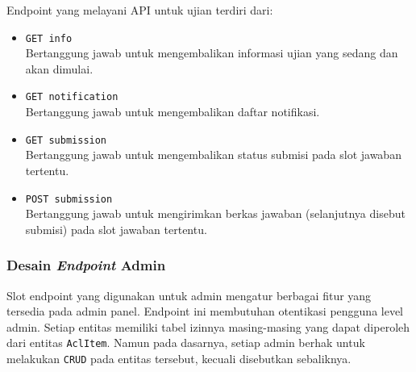     Endpoint yang melayani API untuk ujian terdiri dari:
    \begin{itemize}
        \item \texttt{GET info} \\
            Bertanggung jawab untuk mengembalikan informasi ujian yang sedang
            dan akan dimulai.
        \item \texttt{GET notification} \\
            Bertanggung jawab untuk mengembalikan daftar notifikasi.
        \item \texttt{GET submission} \\
            Bertanggung jawab untuk mengembalikan status submisi pada slot
            jawaban tertentu.
        \item \texttt{POST submission} \\
            Bertanggung jawab untuk mengirimkan berkas jawaban (selanjutnya
            disebut submisi) pada slot jawaban tertentu.
    \end{itemize}
    
\subsubsection{Desain \textit{Endpoint} Admin} Slot endpoint yang digunakan
    untuk admin mengatur berbagai fitur yang tersedia pada admin panel. Endpoint
    ini membutuhan otentikasi pengguna level admin. Setiap entitas memiliki
    tabel izinnya masing-masing yang dapat diperoleh dari entitas
    \texttt{AclItem}. Namun pada dasarnya, setiap admin berhak untuk melakukan
    \texttt{CRUD} pada entitas tersebut, kecuali disebutkan sebaliknya.
    
